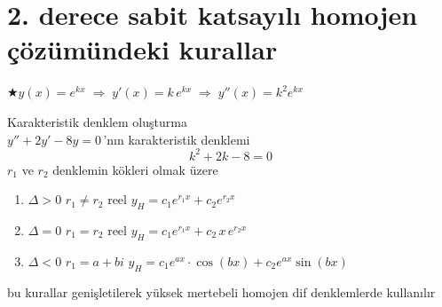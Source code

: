 \documentclass[11pt,a4paper]{article}
\begin{document}
\section{2. derece sabit katsayılı homojen çözümündeki kurallar}

$\bigstar$\quad $y(x) = e^{kx} \;\Rightarrow\; y'(x) = k\,e^{kx} \;\Rightarrow\; y''(x) = k^2 e^{kx}$

\medskip
Karakteristik denklem oluşturma\\
$y'' + 2y' - 8y = 0$\,'nın karakteristik denklemi
\[
  k^2 + 2k - 8 = 0
\]
$r_1$ ve $r_2$ denklemin kökleri olmak üzere

\begin{enumerate}[label=\arabic*)]
  \item $\Delta > 0$ \quad $r_1 \ne r_2$ reel \qquad $y_H = c_1 e^{r_1 x} + c_2 e^{r_2 x}$
  \item $\Delta = 0$ \quad $r_1 = r_2$ reel \qquad $y_H = c_1 e^{r_1 x} + c_2\, x\, e^{r_2 x}$
  \item $\Delta < 0$ \quad $r_1 = a + bi$ \qquad $y_H = c_1 e^{ax}\cdot\cos(bx) + c_2 e^{ax}\sin(bx)$
\end{enumerate}

bu kurallar genişletilerek yüksek mertebeli homojen dif denklemlerde kullanılır
\end{document}

